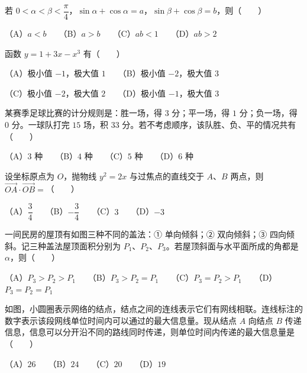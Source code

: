 \begin{question}
若 $0<\alpha<\beta<\dfrac\pi4$，$\sin\alpha+\cos\alpha=a$，$\sin\beta+\cos\beta=b$，则\mbox{（　　）}

（A）$a<b$　　（B）$a>b$　　（C）$ab<1$　　（D）$ab>2$

\end{question}
\begin{question}
函数 $y=1+3x-x^3$ 有\mbox{（　　）}

（A）极小值 $-1$，极大值 $1$　　（B）极小值 $-2$，极大值 $3$

（C）极小值 $-2$，极大值 $2$　　（D）极小值 $-1$，极大值 $3$

\end{question}
\begin{question}
某赛季足球比赛的计分规则是：胜一场，得 $3$ 分；平一场，得 $1$ 分；负一场，得 $0$ 分。一球队打完 $15$ 场，积 $33$ 分。若不考虑顺序，该队胜、负、平的情况共有\mbox{（　　）}

（A）$3$ 种　　（B）$4$ 种　　（C）$5$ 种　　（D）$6$ 种

\end{question}
\begin{question}
设坐标原点为 $O$，抛物线 $y^2=2x$ 与过焦点的直线交于 $A$、$B$ 两点，则 $\overrightarrow{OA}\cdot\overrightarrow{OB}=$\mbox{（　　）}

（A）$\dfrac34$　　（B）$-\dfrac34$　　（C）$3$　　（D）$-3$

\Needspace{0.4\textheight}
\end{question}
\begin{question}
一间民房的屋顶有如图三种不同的盖法：① 单向倾斜；② 双向倾斜；③ 四向倾斜。记三种盖法屋顶面积分别为 $P_1$、$P_2$、$P_3$。若屋顶斜面与水平面所成的角都是 $\alpha$，则\mbox{（　　）}
\nopagebreak[4]
\begin{center}\end{center}
\nopagebreak[4]
（A）$P_3>P_2>P_1$　　（B）$P_3>P_2=P_1$　　（C）$P_3=P_2>P_1$　　（D）$P_3=P_2=P_1$

\Needspace{0.4\textheight}
\end{question}
\begin{question}
如图，小圆圈表示网络的结点，结点之间的连线表示它们有网线相联。连线标注的数字表示该段网线单位时间内可以通过的最大信息量。现从结点 $A$ 向结点 $B$ 传递信息，信息可以分开沿不同的路线同时传递，则单位时间内传递的最大信息量是\mbox{（　　）}
\nopagebreak[4]
\begin{center}\end{center}
\nopagebreak[4]
（A）$26$　　（B）$24$　　（C）$20$　　（D）$19$

\end{question}

